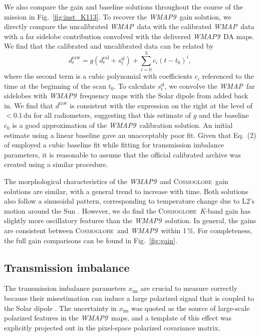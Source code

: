 \documentclass[twocolumn]{../../common/aa}
\def\WMAP{\emph{WMAP}}
\def\WMAPnine{\emph{WMAP9}}
\newcommand{\cosmoglobe}{\textsc{Cosmoglobe}}
\newcommand{\K}[0]{\textit K}
\begin{document}
We also compare the gain and baseline solutions throughout the course of the mission in Fig.~\ref{fig:inst_K113}. To recover the \WMAPnine\ gain solution, we directly compare the uncalibrated \WMAP\ data with the calibrated \WMAP\ data with a far sidelobe contribution convolved with the delivered \WMAPnine\ DA maps. We find that the calibrated and uncalibrated data can be related by
\begin{equation}
	d^\mathrm{raw}_t=g(d^\mathrm{cal}_t+s^\mathrm{sl}_t)+\sum_{i=0}^3c_i(t-t_0)^i,
\end{equation}
where the second term is a cubic polynomial with coefficients $c_i$ referenced to the time at the beginning of the scan $t_0$.
To calculate $s_t^\mathrm{sl}$, we convolve the \WMAP\ far sidelobes with \WMAPnine\ frequency maps with the Solar dipole from \citet{hinshaw2009} added back in.
We find that $d^\mathrm{raw}$ is consistent with the expression on the right at the level of $<0.1\,\mathrm{du}$ for all radiometers, suggesting that this estimate of $g$ and the baseline $c_0$ is a good approximation of the \WMAPnine\ calibration solution. An initial estimate using a linear baseline gave an unacceptably poor fit. Given that Eq.~(2) of \citet{jarosik2003a} employed a cubic baseline fit while fitting for transmission imbalance parameters, it is reasonable to assume that the official calibrated archive was created using a similar procedure.

The morphological characteristics of the \WMAPnine\ and \cosmoglobe\ gain solutions are similar, with a general trend to increase with time. Both solutions also follow a sinusoidal pattern, corresponding to temperature change due to L2's motion around the Sun \citep{wmapexsupp}. However, we do find the  \cosmoglobe\ \K-band gain has slightly more oscillatory features than the \WMAPnine\ solution. In general, the gains are consistent between \cosmoglobe\ and \WMAPnine\ within 1\,\%. For completeness, the full gain comparisons can be found in Fig.~\ref{fig:gain}. 



\subsection{Transmission imbalance}
\label{sec:xim}

The transmission imbalance parameters $x_\mathrm{im}$ are crucial to measure correctly because their misestimation can induce a large polarized signal that is coupled to the Solar dipole \citep{jarosik2007,bp17}. The uncertainty in $x_\mathrm{im}$ was quoted as the source of large-scale polarized features in the \WMAPnine\ maps, and a template of this effect was explicitly projected out in the pixel-space polarized covariance matrix. 
\end{document}
